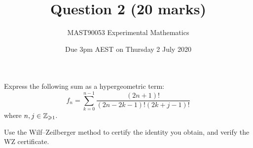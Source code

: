 \documentclass[12pt]{scrartcl}
\title{Question 2 (20 marks)}
\author{MAST90053 Experimental Mathematics}
\date{Due 3pm AEST on Thursday 2 July 2020}
\begin{document}
\thispagestyle{scrheadings}

\maketitle

  Express the following sum as a hypergeometric term:
  \begin{equation*}
    f_n=\sum_{k=0}^{n-1} \frac{(2n+1)!}{(2n-2k-1)!(2k+j-1)!}
  \end{equation*}
  where $n, j\in\mathbb{Z}_{\geqslant 1}$.

  Use the Wilf--Zeilberger method to certify the identity you obtain, and verify the WZ certificate.
\end{document}
